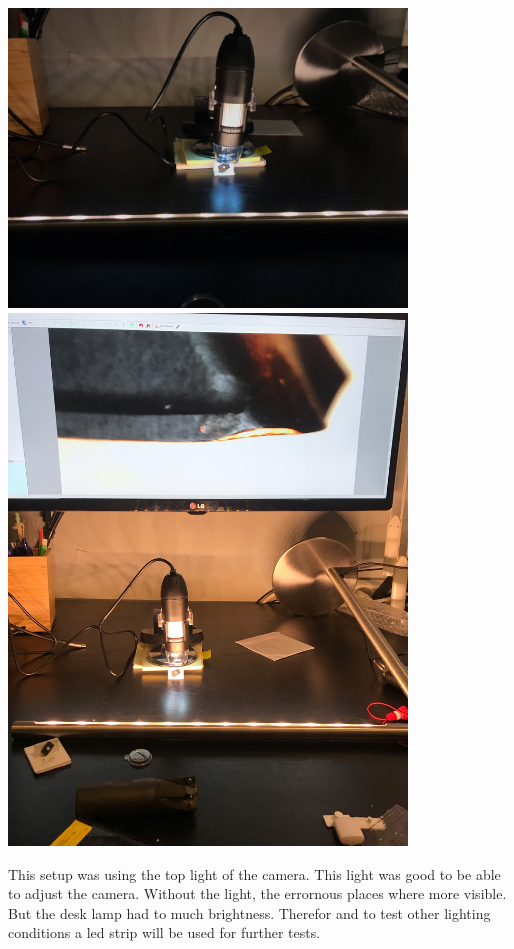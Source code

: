 \includegraphics[width=4.166667in, keepaspectratio=true]{./fig/Camera_setup/Light/Desk_Lamp_Test/eerste_setup_andere_richting.jpeg}\includegraphics[width=4.166667in, keepaspectratio=true]{./fig/Camera_setup/Light/Desk_Lamp_Test/eerste_setup_andere_richting_beeld2.jpeg}



This setup was using the top light of the camera. This light was good to be able to adjust the camera. Without the light, the errornous places where more visible. But the desk lamp had to much brightness. Therefor and to test other lighting conditions a led strip will be used for further tests. 



